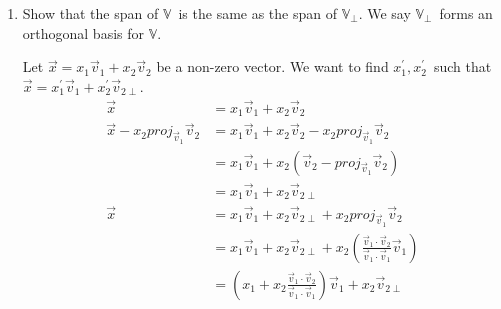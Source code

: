 \documentclass{letter}
\newcommand{\Vn}[1]{\vec{#1}}
\newcommand{\?}{\stackrel{?}{=}}
\newcommand\Que[1]{%
   \leavevmode\noindent
   #1
}
\newcommand\Ans[2][]{%
   \leavevmode\noindent
   {
       \begin{mdframed}[backgroundcolor=blue!10]
       #2
       \end{mdframed}
   }
}
\begin{document}
\begin{enumerate}
\begin{enumerate}[label=(\alph*)]
{        \begin{align*}
            \Vn{0} &= x_1\Vn{v}_1 + x_2\Vn{v}_{2\perp}\\
            \Vn{0} &= x_1\Vn{v}_1 + x_2\left(\Vn{v}_2 - \frac{\Vn{v}_1\cdot\Vn{v}_2}{\Vn{v}_1\cdot\Vn{v}_1}\Vn{v}_1\right)
                   = \left(x_1-x_2\frac{\Vn{v}_1\cdot\Vn{v}_2}{\Vn{v}_1\cdot\Vn{v}_1}\right)\Vn{v}_1 + x_2\Vn{v}_2
            \shortintertext{since we know that $\Vn{v}_1, \Vn{v}_2$\ form a basis, we know that only the trivial solution to $\Vn{0}=x_1^\prime\Vn{v}_1+x_1^\prime\Vn{v}_2$\ exists, thus $x_1^\prime=0$\ and $x_2^\prime=0$\ and}
            x_2\prime&=x_2=0\\
            x_1\prime&=x_1-x_2\frac{\Vn{v}_1\cdot\Vn{v}_2}{\Vn{v}_1\cdot\Vn{v}_1}=0 \\
            x_1&= x_2\frac{\Vn{v}_1\cdot\Vn{v}_2}{\Vn{v}_1\cdot\Vn{v}_1} + x_1^\prime 
               = 0\frac{\Vn{v}_1\cdot\Vn{v}_2}{\Vn{v}_1\cdot\Vn{v}_1}+0 = 0
        \end{align*}
        And we have reached a contradiction since $x_1=0$\ and $x_2=0$\ contradicts our initial claim that at least one is non-zero.
        Therefore $\mathbb{V}_\perp$\ is a set of independent vectors.
    }
    ~\\
    \item \Que{
        Show that the span of $\mathbb{V}$\ is the same as the span of $\mathbb{V}_\perp$.  We say  $\mathbb{V}_\perp$\ forms an orthogonal basis for $\mathbb{V}$.
    }
    \Ans{
    Let $\Vn{x} = x_1\Vn{v}_1 + x_2\Vn{v}_2$ be a non-zero vector.  We want to find $x_1^\prime, x_2^\prime$\ such that 
        $\Vn{x} = x_1^\prime\Vn{v}_1 + x_2^\prime\Vn{v}_{2\perp}$.
        \begin{align*}
            \Vn{x} &= x_1\Vn{v}_1 + x_2\Vn{v}_2 \\
            \Vn{x}-x_2proj_{\Vn{v}_1}\Vn{v}_2 &= x_1\Vn{v}_1 + x_2\Vn{v}_2 - x_2proj_{\Vn{v}_1}\Vn{v}_2 \\
                        &= x_1\Vn{v}_1 + x_2\left(\Vn{v}_2 - proj_{\Vn{v}_1}\Vn{v}_2\right) \\
                        &= x_1\Vn{v}_1 + x_2\Vn{v}_{2\perp}\\
            \Vn{x} &= x_1\Vn{v}_1 + x_2\Vn{v}_{2\perp} + x_2proj_{\Vn{v}_1}\Vn{v}_2 \\
                   &= x_1\Vn{v}_1 + x_2\Vn{v}_{2\perp} + x_2\left(\frac{\Vn{v}_1\cdot\Vn{v}_2}{\Vn{v}_1\cdot\Vn{v}_1}\Vn{v}_1\right)   \\
                   &= \left(x_1+x_2\frac{\Vn{v}_1\cdot\Vn{v}_2}{\Vn{v}_1\cdot\Vn{v}_1}\right)\Vn{v}_1 + x_2\Vn{v}_{2\perp}

\end{align*}}
\end{enumerate}
\end{enumerate}
\end{document}
